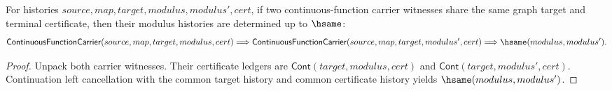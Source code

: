\begin{theorem}
\label{thm:continuous-function-carrier-modulus-deterministic}
For histories $source,map,target,modulus,modulus',cert$, if two
continuous-function carrier witnesses share the same graph target and terminal
certificate, then their modulus histories are determined up to $\hsame$:
$$
\mathsf{ContinuousFunctionCarrier}(source,map,target,modulus,cert)
\Longrightarrow
\mathsf{ContinuousFunctionCarrier}(source,map,target,modulus',cert)
\Longrightarrow
\hsame(modulus,modulus').
$$
\end{theorem}
\begin{proof}
Unpack both carrier witnesses. Their certificate ledgers are
$\mathsf{Cont}(target,modulus,cert)$ and
$\mathsf{Cont}(target,modulus',cert)$. Continuation left cancellation with the
common target history and common certificate history yields
$\hsame(modulus,modulus')$.
\end{proof}

